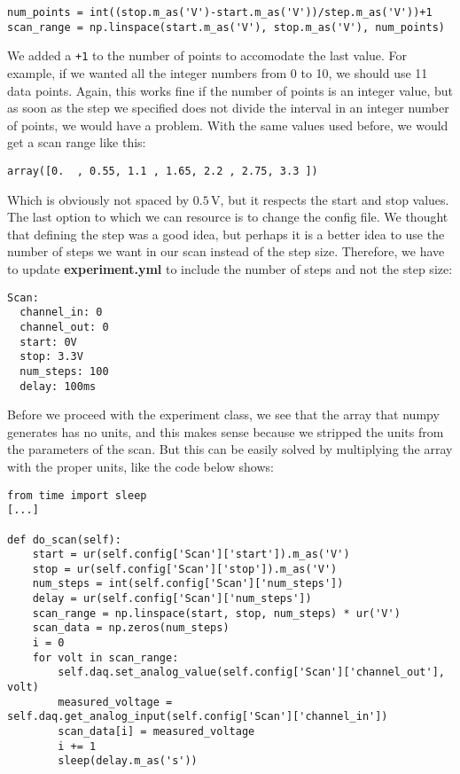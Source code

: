\begin{verbatim}
num_points = int((stop.m_as('V')-start.m_as('V'))/step.m_as('V'))+1
scan_range = np.linspace(start.m_as('V'), stop.m_as('V'), num_points)
\end{verbatim}

We added a \texttt{+1} to the number of points to accomodate the last value. For example, if we wanted all the integer numbers from 0 to 10, we should use 11 data points. Again, this works fine if the number of points is an integer value, but as soon as the step we specified does not divide the interval in an integer number of points, we would have a problem. With the same values used before, we would get a scan range like this:

\begin{verbatim}
array([0.  , 0.55, 1.1 , 1.65, 2.2 , 2.75, 3.3 ])
\end{verbatim}

Which is obviously not spaced by $0.5\,\textrm{V}$, but it respects the start and stop values. The last option to which we can resource is to change the config file. We thought that defining the step was a good idea, but perhaps it is a better idea to use the number of steps we want in our scan instead of the step size. Therefore, we have to update \textbf{experiment.yml} to include the number of steps and not the step size:

\begin{verbatim}
Scan:
  channel_in: 0
  channel_out: 0
  start: 0V
  stop: 3.3V
  num_steps: 100
  delay: 100ms
\end{verbatim}

Before we proceed with the experiment class, we see that the array that numpy generates has no units, and this makes sense because we stripped the units from the parameters of the scan. But this can be easily solved by multiplying the array with the proper units, like the code below shows:

\begin{verbatim}
from time import sleep
[...]

def do_scan(self):
    start = ur(self.config['Scan']['start']).m_as('V')
    stop = ur(self.config['Scan']['stop']).m_as('V')
    num_steps = int(self.config['Scan']['num_steps'])
    delay = ur(self.config['Scan']['num_steps'])
    scan_range = np.linspace(start, stop, num_steps) * ur('V')
    scan_data = np.zeros(num_steps)
    i = 0
    for volt in scan_range:
        self.daq.set_analog_value(self.config['Scan']['channel_out'], volt)
        measured_voltage = self.daq.get_analog_input(self.config['Scan']['channel_in'])
        scan_data[i] = measured_voltage
        i += 1
        sleep(delay.m_as('s'))
\end{verbatim}

